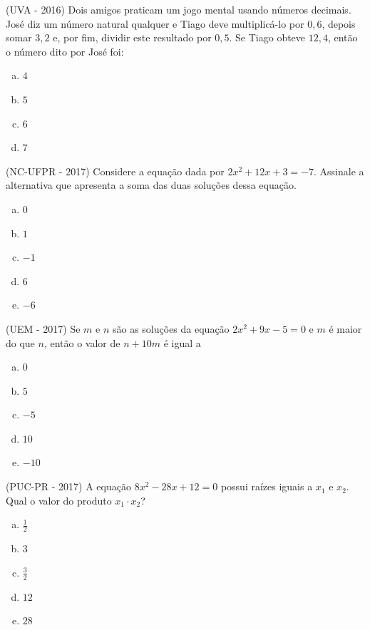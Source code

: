  \begin{exer}
  (UVA - 2016) Dois amigos praticam um jogo mental usando números decimais. José diz um número natural qualquer e Tiago deve multiplicá-lo por $0,6$, depois somar $3,2$ e, por fim, dividir este resultado por $0,5$. Se Tiago obteve $12,4$, então o número dito por José foi:
 \begin{multicols}{5}
 \begin{enumerate}[a)]
 \item $4$
 \item $5$
 \item $6$
 \item $7$
 \end{enumerate}
 \end{multicols}
 \end{exer}

 \begin{exer}
 (NC-UFPR - 2017) Considere a equação dada por $2x^2 + 12x + 3 = -7$. Assinale a alternativa que apresenta a soma das duas soluções dessa equação.
 \begin{multicols}{5}
 \begin{enumerate}[a)]
 \item $0$
 \item $1$
 \item $-1$
 \item $6$
 \item $-6$
 \end{enumerate}
 \end{multicols}
 \end{exer}

 \begin{exer}
 (UEM - 2017) Se $m$ e $n$ são as soluções da equação  $2x^2 +9x - 5 = 0$  e $m$ é maior do que $n$, então o valor de $n +10m$ é igual a
 \begin{multicols}{5}
 \begin{enumerate}[a)]
 \item $0$
 \item $5$
 \item $-5$
 \item $10$
 \item $-10$
 \end{enumerate}
 \end{multicols}
 \end{exer}

 \begin{exer}
 (PUC-PR - 2017) A equação $8x^2 - 28x + 12 = 0$ possui raízes iguais a $x_1$ e $x_2$. Qual o valor do produto $x_1 \cdot x_2$?
 \begin{multicols}{5}
 \begin{enumerate}[a)]
 \item $\frac{1}{2}$
 \item $3$
 \item $\frac{3}{2}$
 \item $12$
 \item $28$
 \end{enumerate}
 \end{multicols}
 \end{exer}

